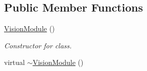 \subsection*{Public Member Functions}
\begin{DoxyCompactItemize}
\item 
\hyperlink{classVisionModule_a08440f0aeb474f1927b98e01953f47b0}{Vision\+Module} ()\hypertarget{classVisionModule_a08440f0aeb474f1927b98e01953f47b0}{}\label{classVisionModule_a08440f0aeb474f1927b98e01953f47b0}

\begin{DoxyCompactList}\small\item\em Constructor for class. \end{DoxyCompactList}\item 
virtual \hyperlink{classVisionModule_a820fbd8149b606d24135e2738beb50ec}{$\sim$\+Vision\+Module} ()\hypertarget{classVisionModule_a820fbd8149b606d24135e2738beb50ec}{}\label{classVisionModule_a820fbd8149b606d24135e2738beb50ec}


\end{DoxyCompactItemize}
